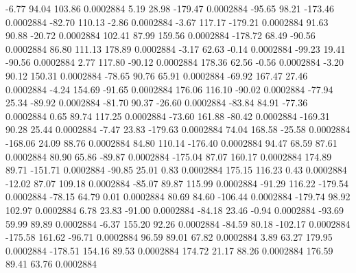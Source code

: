        -6.77       94.04      103.86     0.0002884
        5.19       28.98     -179.47     0.0002884
      -95.65       98.21     -173.46     0.0002884
      -82.70      110.13       -2.86     0.0002884
       -3.67      117.17     -179.21     0.0002884
       91.63       90.88      -20.72     0.0002884
      102.41       87.99      159.56     0.0002884
     -178.72       68.49      -90.56     0.0002884
       86.80      111.13      178.89     0.0002884
       -3.17       62.63       -0.14     0.0002884
      -99.23       19.41      -90.56     0.0002884
        2.77      117.80      -90.12     0.0002884
      178.36       62.56       -0.56     0.0002884
       -3.20       90.12      150.31     0.0002884
      -78.65       90.76       65.91     0.0002884
      -69.92      167.47       27.46     0.0002884
       -4.24      154.69      -91.65     0.0002884
      176.06      116.10      -90.02     0.0002884
      -77.94       25.34      -89.92     0.0002884
      -81.70       90.37      -26.60     0.0002884
      -83.84       84.91      -77.36     0.0002884
        0.65       89.74      117.25     0.0002884
      -73.60      161.88      -80.42     0.0002884
     -169.31       90.28       25.44     0.0002884
       -7.47       23.83     -179.63     0.0002884
       74.04      168.58      -25.58     0.0002884
     -168.06       24.09       88.76     0.0002884
       84.80      110.14     -176.40     0.0002884
       94.47       68.59       87.61     0.0002884
       80.90       65.86      -89.87     0.0002884
     -175.04       87.07      160.17     0.0002884
      174.89       89.71     -151.71     0.0002884
      -90.85       25.01        0.83     0.0002884
      175.15      116.23        0.43     0.0002884
      -12.02       87.07      109.18     0.0002884
      -85.07       89.87      115.99     0.0002884
      -91.29      116.22     -179.54     0.0002884
      -78.15       64.79        0.01     0.0002884
       80.69       84.60     -106.44     0.0002884
     -179.74       98.92      102.97     0.0002884
        6.78       23.83      -91.00     0.0002884
      -84.18       23.46       -0.94     0.0002884
      -93.69       59.99       89.89     0.0002884
       -6.37      155.20       92.26     0.0002884
      -84.59       80.18     -102.17     0.0002884
     -175.58      161.62      -96.71     0.0002884
       96.59       89.01       67.82     0.0002884
        3.89       63.27      179.95     0.0002884
     -178.51      154.16       89.53     0.0002884
      174.72       21.17       88.26     0.0002884
      176.59       89.41       63.76     0.0002884
